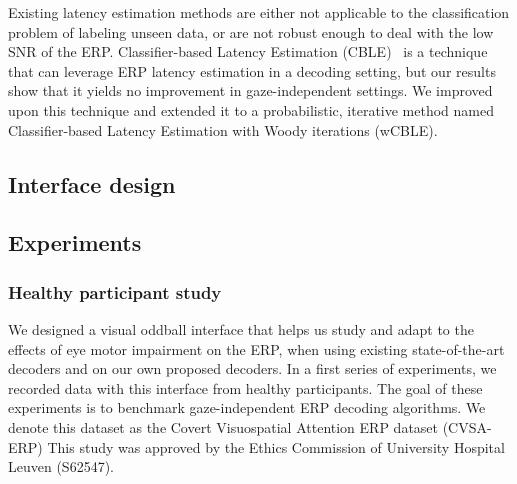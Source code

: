 Existing latency estimation methods are either not applicable to the
classification problem of labeling unseen data, or are not robust enough to
deal with the low SNR of the ERP.
Classifier-based Latency Estimation (CBLE)~\cite{Mowla2017} is a technique that can leverage
ERP latency estimation in a decoding setting, but our results show that it
yields no improvement in gaze-independent settings.
We improved upon this technique and extended it to a probabilistic, iterative
method named Classifier-based Latency Estimation with Woody iterations (wCBLE).


\subsection{Interface design}



\subsection{Experiments}
\subsubsection{Healthy participant study}
We designed a visual oddball interface that helps us study and adapt
to the effects of eye motor impairment on the ERP, when using existing state-of-the-art
decoders and on our own proposed decoders.
In a first series of experiments, we recorded data with this interface from healthy participants.
The goal of these experiments is to benchmark
gaze-independent ERP decoding algorithms.
We denote this dataset as the Covert Visuospatial Attention ERP dataset
(CVSA-ERP)
This study was approved by the Ethics Commission of University Hospital Leuven
(S62547).

